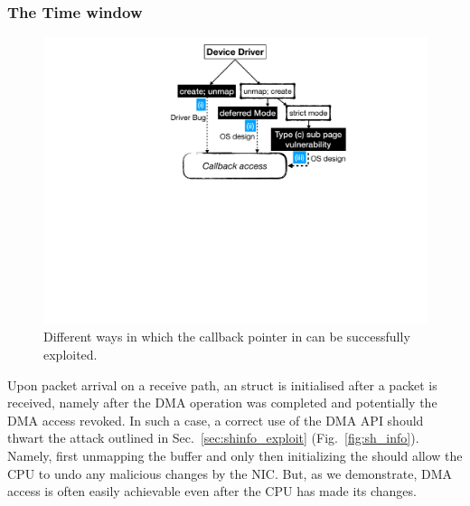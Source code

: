 \subsubsection{The Time window}\label{sec:shinfo}

\begin{figure}[t]
    \centering
    \includegraphics[width=0.75\linewidth]{figs/road_to_op.pdf}
    \caption{Different ways in which the callback pointer in \shinfo can be successfully exploited.}
    \vspace{-2mm}
    \label{fig:road_to_op}
\end{figure}


Upon packet arrival on a receive path, an \shinfo struct is initialised after a packet is received, namely after the DMA operation was completed and potentially the DMA access revoked. In such a case,
a correct use of the DMA API should thwart the attack outlined in Sec.~\ref{sec:shinfo_exploit} (Fig.~\ref{fig:sh_info}). Namely, first unmapping the buffer and only then initializing the \shinfo{} should allow the CPU to undo any malicious changes by the NIC. But, as we demonstrate, DMA access is often easily achievable even after the CPU has made its changes. 

